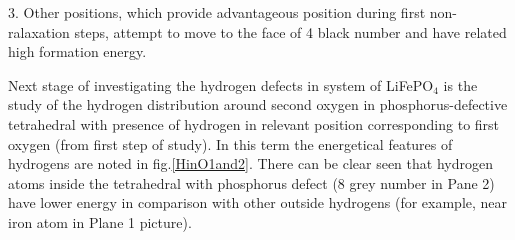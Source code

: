3. Other positions, which provide advantageous position during first non-ralaxation steps, attempt to move to the face of 4 black number and have related high formation energy.


Next stage of investigating the hydrogen defects in system of LiFePO$_4$ is the study of the hydrogen distribution around second oxygen in phosphorus-defective tetrahedral with presence of hydrogen in relevant position corresponding to first oxygen (from first step of study). In this term the energetical features of hydrogens are noted in fig.\ref{HinO1and2}. There can be clear seen that hydrogen atoms inside the tetrahedral with phosphorus defect (8 grey number in Pane 2) have lower energy in comparison with other outside hydrogens (for example, near iron atom in Plane 1 picture).

